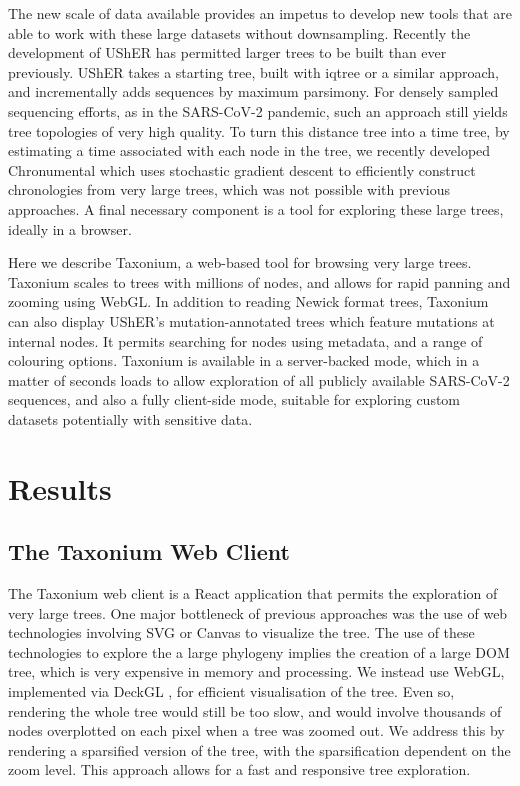 The new scale of data available provides an impetus to develop new tools that are able to work with these large datasets without downsampling. Recently the development of UShER \citep{usher} has permitted larger trees to be built than ever previously. UShER takes a starting tree, built with iqtree or a similar approach, and incrementally adds sequences by maximum parsimony. For densely sampled sequencing efforts, as in the SARS-CoV-2 pandemic, such an approach still yields tree topologies of very high quality. To turn this distance tree into a time tree, by estimating a time associated with each node in the tree, we recently developed Chronumental \citep{chronumental} which uses stochastic gradient descent to efficiently construct chronologies from very large trees, which was not possible with previous approaches. A final necessary component is a tool for exploring these large trees, ideally in a browser.

Here we describe Taxonium, a web-based tool for browsing very large trees. Taxonium scales to trees with millions of nodes, and allows for rapid panning and zooming using WebGL. In addition to reading Newick format trees, Taxonium can also display UShER's mutation-annotated trees which feature mutations at internal nodes. It permits searching for nodes using metadata, and a range of colouring options. Taxonium is available in a server-backed mode, which in a matter of seconds loads to allow exploration of all publicly available SARS-CoV-2 sequences, and also a fully client-side mode, suitable for exploring custom datasets potentially with sensitive data.


\section*{Results}\label{s:results}

\subsection*{The Taxonium Web Client}

The Taxonium web client is a React application that permits the exploration of very large trees. One major bottleneck of previous approaches was the use of web technologies involving SVG or Canvas to visualize the tree. The use of these technologies to explore the a large phylogeny implies the creation of a large DOM tree, which is very expensive in memory and processing. We instead use WebGL, implemented via DeckGL \citep{deckgl}, for efficient visualisation of the tree. Even so, rendering the whole tree would still be too slow, and would involve thousands of nodes overplotted on each pixel when a tree was zoomed out. We address this by rendering a sparsified version of the tree, with the sparsification dependent on the zoom level. This approach allows for a fast and responsive tree exploration.

